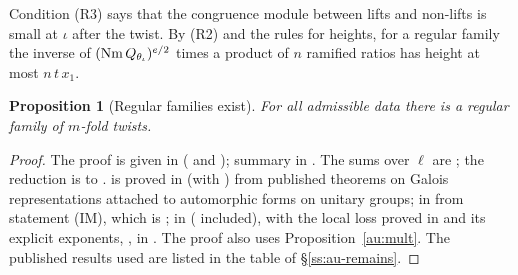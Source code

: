 \documentclass[10pt]{amsart}
\newtheorem{proposition}[theorem]{Proposition}
\theoremstyle{definition}
\theoremstyle{remark}
\begin{document}
Condition (R3) says that the congruence module between lifts and non-lifts is small at $\iota$
after the twist. By (R2) and the rules for heights, for a regular family the inverse of
$(\operatorname{Nm} Q_{\theta_\iota})^{e/2}$ times a product of $n$ ramified ratios has height at most
$n\,t\,x_1$.

\begin{proposition}[Regular families exist]\label{au:regular}
For all admissible data there is a regular family of $m$-fold twists.
\end{proposition}
\begin{proof}
The proof is given in {\cite[\S2]{P55}} ({\cite[Theorem~2.2]{P55}} and {\cite[Lemma~2.5]{P55}}); summary in
{\cite[\S2.7]{P55}}. The sums over $\ell$ are {\cite[Lemma~2.5]{P55}}; the
reduction is to {\cite[Theorems~2.8, 2.9 and~2.10]{P55}}. {\cite[Theorem~2.8]{P55}} is proved in
{\cite[\S6.1]{P55}} (with {\cite[Proposition~8.15]{P55}}) from published theorems on Galois representations
attached to automorphic forms on unitary groups; {\cite[Theorem~2.9]{P55}} in {\cite[\S3]{P55}} from
statement {\rm(IM)}, which is {\cite[Propositions~3.8 and~3.12]{P54}}; {\cite[Theorem~2.10]{P55}} in
{\cite[\S\S4--8.3]{P55}} ({\cite[Propositions~4.10, 4.11 and~4.12]{P55}} included),
with the local loss {\cite[Proposition~2.28]{P55}} proved in {\cite[\S5]{P55}} and its explicit exponents,
{\cite[Theorem~5.8]{P55}}, in {\cite[\S2.3]{P56}}. The proof also uses Proposition~\ref{au:mult}.
The published results used are listed in the table of \S\ref{ss:au-remains}.
\end{proof}
\end{document}
